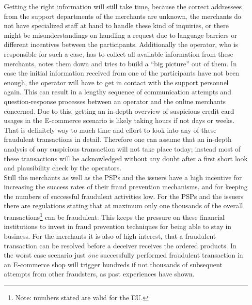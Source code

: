 Getting the right information will still take time, because the correct addressees from the support departments of the merchants are unknown, the merchants do not have specialized staff at hand to handle these kind of inquiries, or there might be misunderstandings on handling a request due to language barriers or different incentives between the participants. Additionally the operator, who is responsible for such a case, has to collect all available information from these merchants, notes them down and tries to build a ``big picture'' out of them. In case the initial information received from one of the participants have not been enough, the operator will have to get in contact with the support personnel again. This can result in a lengthy sequence of communication attempts and question-response processes between an operator and the online merchants concerned. Due to this, getting an in-depth overview of suspicious credit card usages in the \gls{E-commerce} scenario is likely taking hours if not days or weeks. That is definitely way to much time and effort to look into any of these fraudulent transactions in detail. Therefore one can assume that an in-depth analysis of any suspicious transaction will not take place today; instead most of these transactions will be acknowledged without any doubt after a first short look and plausibility check by the operators. \\

Still the merchants as well as the \gls{PSP}s and the issuers have a high incentive for increasing the success rates of their fraud prevention mechanisms, and for keeping the numbers of successful fraudulent activities low. For the \gls{PSP}s and the issuers there are regulations stating that at maximum only one thousands of the overall transactions\footnote{Note: numbers stated are valid for the EU.} can be fraudulent. This keeps the pressure on these financial institutions to invest in fraud prevention techniques for being able to stay in business. For the merchants it is also of high interest, that a fraudulent transaction can be resolved before a deceiver receives the ordered products. In the worst case scenario just \emph{one} successfully performed fraudulent transaction in an \gls{E-commerce} shop will trigger hundreds if not thousands of subsequent attempts from other fraudsters, as past experiences have shown.


